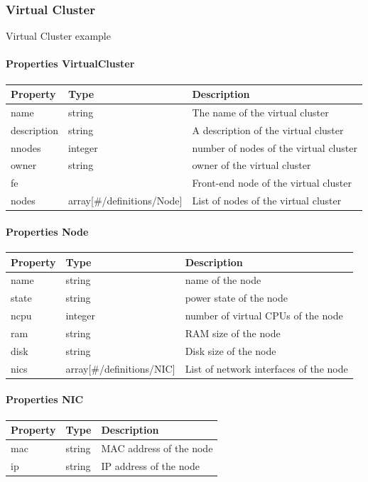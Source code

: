 \documentclass[9pt,]{article}
\let\oldparagraph\paragraph
\renewcommand{\paragraph}[1]{\oldparagraph{#1}\mbox{}}
\begin{document}
\hypertarget{virtual-cluster}{%
\subsubsection{Virtual Cluster}\label{virtual-cluster}}

Virtual Cluster example

\hypertarget{properties-virtualcluster}{%
\paragraph{Properties VirtualCluster}\label{properties-virtualcluster}}

\begin{longtable}[]{@{}lll@{}}
\toprule
Property & Type & Description\tabularnewline
\midrule
\endhead
name & string & The name of the virtual cluster\tabularnewline
description & string & A description of the virtual
cluster\tabularnewline
nnodes & integer & number of nodes of the virtual cluster\tabularnewline
owner & string & owner of the virtual cluster\tabularnewline
fe & & Front-end node of the virtual cluster\tabularnewline
nodes & array{[}\#/definitions/Node{]} & List of nodes of the virtual
cluster\tabularnewline
\bottomrule
\end{longtable}

\hypertarget{properties-node}{%
\paragraph{Properties Node}\label{properties-node}}

\begin{longtable}[]{@{}lll@{}}
\toprule
Property & Type & Description\tabularnewline
\midrule
\endhead
name & string & name of the node\tabularnewline
state & string & power state of the node\tabularnewline
ncpu & integer & number of virtual CPUs of the node\tabularnewline
ram & string & RAM size of the node\tabularnewline
disk & string & Disk size of the node\tabularnewline
nics & array{[}\#/definitions/NIC{]} & List of network interfaces of the
node\tabularnewline
\bottomrule
\end{longtable}

\hypertarget{properties-nic}{%
\paragraph{Properties NIC}\label{properties-nic}}

\begin{longtable}[]{@{}lll@{}}
\toprule
Property & Type & Description\tabularnewline
\midrule
\endhead
mac & string & MAC address of the node\tabularnewline
ip & string & IP address of the node\tabularnewline
\bottomrule
\end{longtable}
\end{document}
